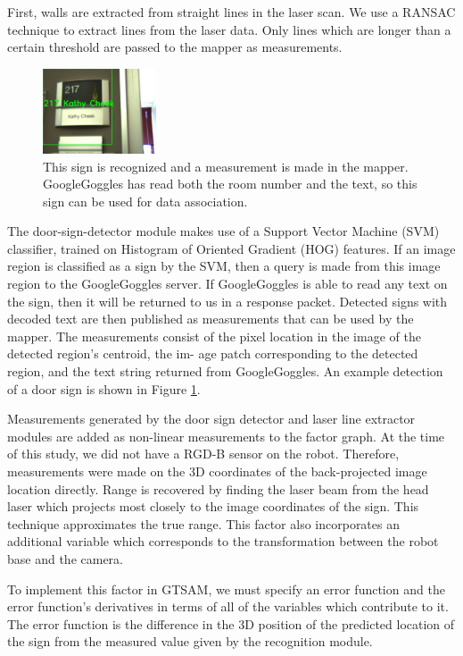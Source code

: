 \documentclass{tADR2e}
\begin{document}
First, walls are extracted from straight lines in the laser scan. We use a
RANSAC technique to extract lines from the laser data. Only lines which are longer than a certain threshold are passed to the mapper as measurements.

\begin{figure}[ht!]
\begin{center}
\centering
\includegraphics[width=0.3\textwidth]{pics/door_sign}
\caption{This sign is recognized and a measurement is made in the mapper. GoogleGoggles has read both the room number and the text, so this sign can be used for
data association.} 
\label{fig:door_sign}
\end{center}
\end{figure}

The door-sign-detector module makes use of a Support Vector Machine (SVM) classifier, trained on Histogram of Oriented
Gradient (HOG) features. If an image region
is classified as a sign by the SVM, then a query is made from this image region to
the GoogleGoggles server. If GoogleGoggles is able to read any text on the sign, then
it will be returned to us in a response packet. Detected signs with decoded text are
then published as measurements that can be used by the mapper. The measurements
consist of the pixel location in the image of the detected region’s centroid, the im-
age patch corresponding to the detected region, and the text string returned from
GoogleGoggles. An example detection of a door sign is shown in Figure \ref{fig:door_sign}.

Measurements generated by the door sign detector and laser line extractor modules are added as non-linear measurements to the factor graph. At the time of this study, we did not have a RGD-B sensor on the robot. Therefore, measurements were made on the 3D coordinates of the back-projected image location directly. Range is recovered by finding the laser beam from the head laser which
projects most closely to the image coordinates of the sign. This technique approximates the true range. This factor also incorporates an additional variable which corresponds
to the transformation between the robot base and the camera. 

To implement this factor in GTSAM, we must specify an error function and the
error function’s derivatives in terms of all of the variables which contribute to it. The
error function is the difference in the 3D position of the predicted location of the sign
from the measured value given by the recognition module. 
\end{document}

